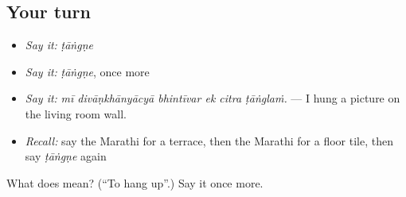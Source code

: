 \subsection*{Your turn}
\begin{itemize}
\raggedright
  \item \emph{Say it:} \emph{ṭāṅgṇe}
  \item \emph{Say it:} \emph{ṭāṅgṇe}, once more
  \item \emph{Say it:} \emph{mī divāṇkhānyācyā bhintīvar ek citra ṭāṅglaṁ.} — I hung a picture on the living room wall.
  \item \emph{Recall:} say the Marathi for a terrace, then the Marathi for a floor tile, then say \emph{ṭāṅgṇe} again
\end{itemize}

\begin{tcolorbox}[breakable,colback=teal!4,colframe=teal!35!black,title={Before you move on}]
What does  mean? (\textquotedblleft{}To hang up\textquotedblright{}.) Say it once more.
\end{tcolorbox}
